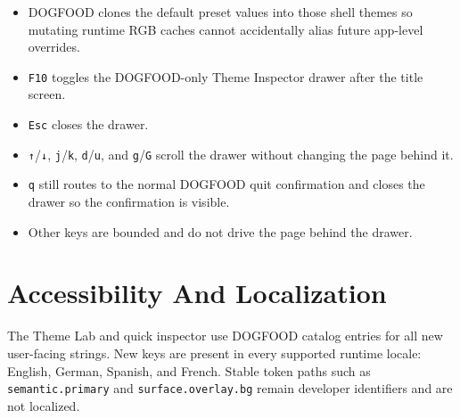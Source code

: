 \begin{itemize}
  \begin{itemize}
  \tightlist
  \item
    family id: \texttt{d\allowbreak{}o\allowbreak{}g\allowbreak{}f\allowbreak{}o\allowbreak{}o\allowbreak{}d}
  \item
    dark choice id: \texttt{d\allowbreak{}o\allowbreak{}g\allowbreak{}f\allowbreak{}o\allowbreak{}o\allowbreak{}d\allowbreak{}:\allowbreak{}d\allowbreak{}a\allowbreak{}r\allowbreak{}k}, concrete theme name: \texttt{d\allowbreak{}o\allowbreak{}g\allowbreak{}f\allowbreak{}o\allowbreak{}o\allowbreak{}d\allowbreak{}-\allowbreak{}d\allowbreak{}a\allowbreak{}r\allowbreak{}k}
  \item
    light choice id: \texttt{d\allowbreak{}o\allowbreak{}g\allowbreak{}f\allowbreak{}o\allowbreak{}o\allowbreak{}d\allowbreak{}:\allowbreak{}l\allowbreak{}i\allowbreak{}g\allowbreak{}h\allowbreak{}t}, concrete theme name: \texttt{d\allowbreak{}o\allowbreak{}g\allowbreak{}f\allowbreak{}o\allowbreak{}o\allowbreak{}d\allowbreak{}-\allowbreak{}l\allowbreak{}i\allowbreak{}g\allowbreak{}h\allowbreak{}t}
  \end{itemize}
\item
  DOGFOOD clones the default preset values into those shell themes so mutating runtime RGB caches cannot accidentally alias future app-level overrides.
\item
  \texttt{F\allowbreak{}1\allowbreak{}0} toggles the DOGFOOD-only Theme Inspector drawer after the title screen.
\item
  \texttt{E\allowbreak{}s\allowbreak{}c} closes the drawer.
\item
  \texttt{↑}/\texttt{↓}, \texttt{j}/\texttt{k}, \texttt{d}/\texttt{u}, and \texttt{g}/\texttt{G} scroll the drawer without changing the page behind it.
\item
  \texttt{q} still routes to the normal DOGFOOD quit confirmation and closes the drawer so the confirmation is visible.
\item
  Other keys are bounded and do not drive the page behind the drawer.
\end{itemize}

\section{Accessibility And Localization}\label{record-179-accessibility-and-localization}

The Theme Lab and quick inspector use DOGFOOD catalog entries for all new user-facing strings. New keys are present in every supported runtime locale: English, German, Spanish, and French. Stable token paths such as \texttt{s\allowbreak{}e\allowbreak{}m\allowbreak{}a\allowbreak{}n\allowbreak{}t\allowbreak{}i\allowbreak{}c\allowbreak{}.\allowbreak{}p\allowbreak{}r\allowbreak{}i\allowbreak{}m\allowbreak{}a\allowbreak{}r\allowbreak{}y} and \texttt{s\allowbreak{}u\allowbreak{}r\allowbreak{}f\allowbreak{}a\allowbreak{}c\allowbreak{}e\allowbreak{}.\allowbreak{}o\allowbreak{}v\allowbreak{}e\allowbreak{}r\allowbreak{}l\allowbreak{}a\allowbreak{}y\allowbreak{}.\allowbreak{}b\allowbreak{}g} remain developer identifiers and are not localized.

